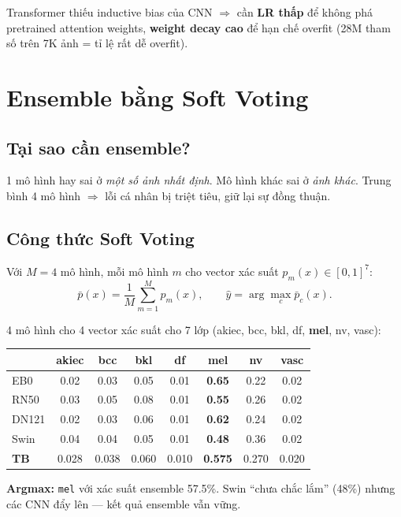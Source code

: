 \documentclass[11pt,a4paper]{article}
\begin{document}
\begin{idea}
Transformer thiếu inductive bias của CNN $\Rightarrow$ cần \textbf{LR thấp} để không phá pretrained attention weights, \textbf{weight decay cao} để hạn chế overfit (28M tham số trên 7K ảnh = tỉ lệ rất dễ overfit).
\end{idea}

\section{Ensemble bằng Soft Voting}

\subsection{Tại sao cần ensemble?}

\begin{simple}
1 mô hình hay sai ở \textit{một số ảnh nhất định}. Mô hình khác sai ở \textit{ảnh khác}. Trung bình 4 mô hình $\Rightarrow$ lỗi cá nhân bị triệt tiêu, giữ lại sự đồng thuận.
\end{simple}

\subsection{Công thức Soft Voting}

Với $M = 4$ mô hình, mỗi mô hình $m$ cho vector xác suất $p_m(x) \in [0,1]^7$:
\[
  \bar{p}(x) = \frac{1}{M} \sum_{m=1}^{M} p_m(x), \qquad \hat{y} = \arg\max_c \bar{p}_c(x).
\]

\begin{example}
4 mô hình cho 4 vector xác suất cho 7 lớp (akiec, bcc, bkl, df, \textbf{mel}, nv, vasc):

\small
\begin{tabular}{lccccccc}
\toprule
& akiec & bcc & bkl & df & \textbf{mel} & nv & vasc \\
\midrule
EB0    & 0.02 & 0.03 & 0.05 & 0.01 & \textbf{0.65} & 0.22 & 0.02 \\
RN50   & 0.03 & 0.05 & 0.08 & 0.01 & \textbf{0.55} & 0.26 & 0.02 \\
DN121  & 0.02 & 0.03 & 0.06 & 0.01 & \textbf{0.62} & 0.24 & 0.02 \\
Swin   & 0.04 & 0.04 & 0.05 & 0.01 & \textbf{0.48} & 0.36 & 0.02 \\
\midrule
\textbf{TB} & 0.028 & 0.038 & 0.060 & 0.010 & \textbf{0.575} & 0.270 & 0.020 \\
\bottomrule
\end{tabular}
\normalsize

\textbf{Argmax:} \texttt{mel} với xác suất ensemble 57.5\%. Swin ``chưa chắc lắm'' (48\%) nhưng các CNN đẩy lên --- kết quả ensemble vẫn vững.
\end{example}
\end{document}

